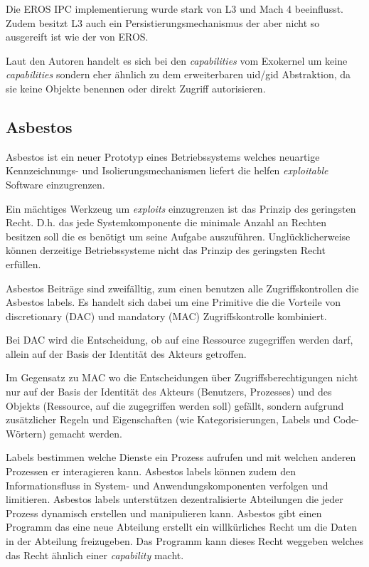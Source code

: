 \documentclass[9pt,technote]{IEEEtran}
\begin{document}
        Die EROS IPC implementierung wurde stark von L3 und Mach 4 beeinflusst. 
        Zudem besitzt L3 auch ein Persistierungsmechanismus der aber nicht so ausgereift ist wie der von EROS.
        
        Laut den Autoren \cite{inproc:eros} handelt es sich bei den \textit{capabilities} vom Exokernel um keine 
        \textit{capabilities} sondern eher \"ahnlich zu dem erweiterbaren uid/gid Abstraktion,
        da sie keine Objekte benennen oder direkt Zugriff autorisieren.
        
    \subsection{Asbestos}        
      Asbestos ist ein neuer Prototyp eines Betriebssystems welches neuartige Kennzeichnungs- und Isolierungsmechanismen 
      liefert die helfen \textit{exploitable} Software einzugrenzen.

      Ein m\"achtiges Werkzeug um \textit{exploits} einzugrenzen ist das Prinzip des geringsten Recht. 
      D.h. das jede Systemkomponente die minimale Anzahl an Rechten besitzen soll
      die es ben\"otigt um seine Aufgabe auszuf\"uhren. Ungl\"ucklicherweise k\"onnen derzeitige Betriebssysteme nicht das Prinzip des geringsten Recht erf\"ullen.
      
      Asbestos Beitr\"age sind zweif\"alltig, zum einen benutzen alle Zugriffskontrollen die Asbestos labels. 
      Es handelt sich dabei um eine Primitive die die Vorteile
      von discretionary (DAC) und mandatory (MAC) Zugriffskontrolle kombiniert.
      
      Bei DAC wird die Entscheidung, ob auf eine Ressource zugegriffen werden darf,  
      allein auf der Basis der Identität des Akteurs getroffen. 
      
      Im Gegensatz zu MAC wo die Entscheidungen über Zugriffsberechtigungen nicht nur auf der Basis der Identität des Akteurs 
      (Benutzers, Prozesses) und des Objekts (Ressource, auf die zugegriffen     
      werden soll) gefällt, sondern aufgrund zusätzlicher Regeln und Eigenschaften (wie Kategorisierungen, Labels und Code-Wörtern) gemacht werden.
      
      Labels bestimmen welche Dienste ein Prozess aufrufen und mit welchen anderen Prozessen er interagieren kann. 
      Asbestos labels k\"onnen zudem den Informationsfluss in
      System- und Anwendungskomponenten verfolgen und limitieren.
      Asbestos labels unterst\"utzen dezentralisierte Abteilungen die jeder Prozess dynamisch erstellen und manipulieren kann.
      Asbestos gibt einen Programm das eine neue Abteilung erstellt ein willk\"urliches Recht um die Daten in der Abteilung freizugeben.
      Das Programm kann dieses Recht weggeben welches das Recht \"ahnlich einer \textit{capability} macht.
      
\end{document}

